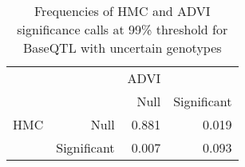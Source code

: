 \begin{table}[ht]
\centering
\caption{Frequencies of HMC and ADVI significance calls at 99\% threshold for BaseQTL with uncertain genotypes} 
\label{tab:noGT-xtab-prop-99}
\begin{tabular}{rr|rr}
   &  & ADVI &  \\ 
    &   & Null & Significant \\ 
   \hline
HMC & Null & 0.881 & 0.019 \\ 
    & Significant & 0.007 & 0.093 \\ 
  \end{tabular}
\end{table}
